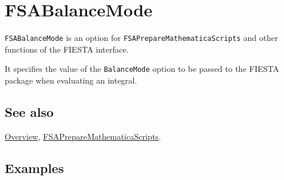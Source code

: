 \documentclass[../FeynHelpersManual.tex]{subfiles}
\begin{document}
\hypertarget{fsabalancemode}{
\section{FSABalanceMode}\label{fsabalancemode}}

\texttt{FSABalanceMode} is an option for
\texttt{FSAPrepareMathematicaScripts} and other functions of the FIESTA
interface.

It specifies the value of the \texttt{BalanceMode} option to be passed
to the FIESTA package when evaluating an integral.

\subsection{See also}

\hyperlink{toc}{Overview},
\hyperlink{fsapreparemathematicascripts}{FSAPrepareMathematicaScripts}.

\subsection{Examples}
\end{document}
